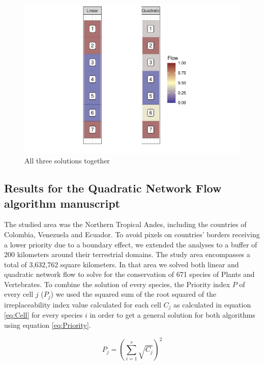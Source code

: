 \documentclass[]{article}
\begin{document}
\begin{figure}
\centering
\includegraphics{TagetBasedNew_files/figure-latex/Sols-1.pdf}
\caption{\label{fig:Sols}All three solutions together}
\end{figure}

\hypertarget{results-for-the-quadratic-network-flow-algorithm-manuscript}{%
\subsection{Results for the Quadratic Network Flow algorithm manuscript}\label{results-for-the-quadratic-network-flow-algorithm-manuscript}}

The studied area was the Northern Tropical Andes, including the countries of Colombia, Venezuela and
Ecuador. To avoid pixels on countries' borders receiving a lower priority due to a boundary effect,
we extended the analyses to a buffer of 200 kilometers around their terrestrial domains. The study area
encompasses a total of 3,632,762 square kilometers. In that area we solved both linear and quadratic network flow to solve for the conservation of 671 species of Plants and Vertebrates. To combine the solution of every species, the Priority index \(P\) of every cell \(j\) (\(P_j\)) we used the squared sum of the root squared of the irreplaceability index value calculated for each cell \(C_j\) as calculated in equation \eqref{eq:Cell} for every species \(i\) in order to get a general solution for both algorithms using equation \eqref{eq:Priority}.

\begin{equation} 
  P_j = (\sum_{i=1}^{s}\sqrt{C_{j}})^2
  \label{eq:Priority}
\end{equation}
\end{document}
